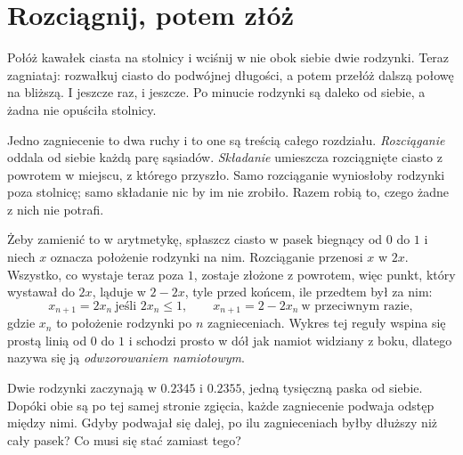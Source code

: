 \section{Rozciągnij, potem złóż}
\label{sec:ch10-knead}

\noindent
Połóż kawałek ciasta na stolnicy i wciśnij w nie obok siebie dwie rodzynki.
Teraz zagniataj: rozwałkuj ciasto do podwójnej długości, a potem przełóż
dalszą połowę na bliższą. I jeszcze raz, i jeszcze. Po minucie rodzynki są
daleko od siebie, a żadna nie opuściła stolnicy.

Jedno zagniecenie to dwa ruchy i to one są treścią całego rozdziału.
\emph{Rozciąganie} oddala od siebie każdą parę sąsiadów. \emph{Składanie}
umieszcza rozciągnięte ciasto z powrotem w miejscu, z którego przyszło. Samo
rozciąganie wyniosłoby rodzynki poza stolnicę; samo składanie nic by im nie
zrobiło. Razem robią to, czego żadne z nich nie potrafi.

Żeby zamienić to w arytmetykę, spłaszcz ciasto w pasek biegnący od $0$ do $1$
i niech $x$ oznacza położenie rodzynki na nim. Rozciąganie przenosi $x$ w
$2x$. Wszystko, co wystaje teraz poza $1$, zostaje złożone z powrotem, więc
punkt, który wystawał do $2x$, ląduje w $2 - 2x$, tyle przed końcem, ile
przedtem był za nim:
\[ x_{n+1} = 2x_n \ \text{jeśli } 2x_n \le 1, \qquad
   x_{n+1} = 2 - 2x_n \ \text{w przeciwnym razie}, \]
gdzie $x_n$ to położenie rodzynki po $n$ zagnieceniach. Wykres tej reguły
wspina się prostą linią od $0$ do $1$ i schodzi prosto w dół jak namiot
widziany z boku, dlatego nazywa się ją \emph{odwzorowaniem namiotowym}.

\begin{think}
Dwie rodzynki zaczynają w $\num{0.2345}$ i $\num{0.2355}$, jedną tysięczną
paska od siebie. Dopóki obie są po tej samej stronie zgięcia, każde
zagniecenie podwaja odstęp między nimi. Gdyby podwajał się dalej, po ilu
zagnieceniach byłby dłuższy niż cały pasek? Co musi się stać zamiast tego?
\end{think}



